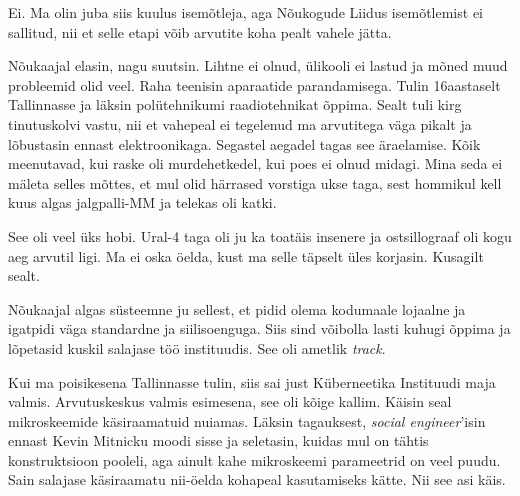 
Ei. Ma olin juba siis kuulus isemõtleja, aga Nõukogude Liidus 
isemõtlemist ei sallitud, nii et selle etapi võib arvutite 
koha pealt vahele jätta. 

Nõukaajal elasin, nagu suutsin. Lihtne ei 
olnud, ülikooli ei lastud ja mõned muud probleemid olid veel. Raha
teenisin aparaatide parandamisega. Tulin 16aastaselt 
Tallinnasse ja läksin polütehnikumi 
raadiotehnikat õppima. Sealt tuli kirg tinutuskolvi vastu, nii et vahepeal ei tegelenud ma arvutitega väga 
pikalt ja lõbustasin ennast 
elektroonikaga. Segastel aegadel tagas see
äraelamise. Kõik meenutavad, kui raske oli murdehetkedel, kui 
poes ei olnud midagi. Mina seda ei mäleta selles mõttes, et 
mul olid härrased vorstiga ukse taga, sest hommikul kell 
kuus algas jalgpalli-MM ja telekas oli katki. 


See oli veel üks hobi. Ural-4 
taga oli ju ka toatäis insenere ja ostsillograaf 
oli kogu aeg arvutil ligi. Ma ei oska öelda, kust ma selle täpselt üles 
korjasin. Kusagilt sealt. 


Nõukaajal algas süsteemne ju sellest, et pidid olema kodumaale lojaalne ja 
igatpidi väga standardne ja siilisoenguga. Siis sind võibolla lasti kuhugi 
õppima ja lõpetasid kuskil salajase töö instituudis. See oli ametlik \emph{track}. 

Kui ma poisikesena Tallinnasse tulin, siis sai just Küberneetika Instituudi maja valmis. Arvutuskeskus valmis esimesena, see oli kõige kallim. Käisin seal
mikroskeemide käsiraamatuid nuiamas. Läksin tagauksest, \emph{social 
engineer}'isin ennast Kevin Mitnicku moodi sisse ja 
seletasin, kuidas mul on tähtis konstruktsioon pooleli, aga ainult 
kahe mikroskeemi parameetrid on veel puudu. Sain salajase 
käsiraamatu nii-öelda kohapeal kasutamiseks kätte. Nii see asi käis. 


